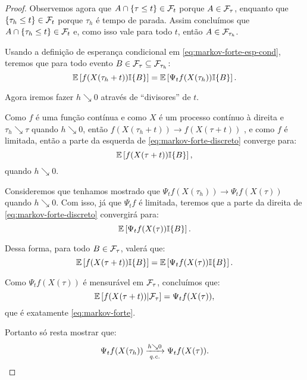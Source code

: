 \begin{proof}
  Observemos agora que $A \cap \{ \tau \leq t \} \in {\mathcal{F}}_t$ porque $A
  \in {\mathcal{F}}_\tau$, enquanto que $ \{ \tau_h \leq t \} \in {\mathcal{F}}_t$ porque
  $\tau_h$ é tempo de parada. Assim concluímos que $A \cap \{ \tau_h
  \leq t \} \in {\mathcal{F}}_t$ e, como isso vale para todo $t$, então $A \in
  {\mathcal{F}}_{\tau_h}$.

  Usando a definição de esperança condicional em
  \eqref{eq:markov-forte-esp-cond}, teremos que para todo evento $B
  \in {\mathcal{F}}_{\tau} \subseteq {\mathcal{F}}_{\tau_h}$:
  \begin{equation}
    \label{eq:markov-forte-discreto}
    {\mathbb{E}} \left[ f(X(\tau_h + t)) {\mathbb{I}}\{B\} \right]
    = {\mathbb{E}} \left[ \Psi_t f (X(\tau_h)) {\mathbb{I}}\{B\} \right].
  \end{equation}

  Agora iremos fazer $h \searrow 0$ através de ``divisores'' de $t$.

  Como $f$ é uma função contínua e como $X$ é um processo contínuo à
  direita e $\tau_h \searrow \tau$ quando $h \searrow 0$, então
  $f(X(\tau_h + t)) \to f(X(\tau + t))$ \qc, e como $f$ é limitada,
  então a parte da esquerda de \eqref{eq:markov-forte-discreto}
  converge para:
  \begin{displaymath}
    {\mathbb{E}} \left[ f(X(\tau + t)) {\mathbb{I}}\{B\} \right],
  \end{displaymath}
  quando $h \searrow 0$.

  Consideremos que tenhamos mostrado que $\Psi_t f (X(\tau_h)) \to
  \Psi_t f(X(\tau))$ \qc quando $h \searrow 0$. Com isso, já que
  $\Psi_t f$ é limitada, teremos que a parte da direita de
  \eqref{eq:markov-forte-discreto} convergirá para:
  \begin{displaymath}
    {\mathbb{E}} \left[ \Psi_t f (X(\tau)) {\mathbb{I}}\{B\} \right].
  \end{displaymath}

  Dessa forma, para todo $B \in {\mathcal{F}}_{\tau}$, valerá que:
  \begin{displaymath}
    {\mathbb{E}} \left[ f(X(\tau + t)) {\mathbb{I}}\{B\} \right]
    = {\mathbb{E}} \left[ \Psi_t f (X(\tau)) {\mathbb{I}}\{B\} \right].
  \end{displaymath}

  Como $\Psi_t f(X(\tau))$ é mensurável em ${\mathcal{F}}_\tau$, concluímos que:
  \begin{displaymath}
    {\mathbb{E}} \left[ f(X(\tau + t)) \middle| {\mathcal{F}}_\tau \right]
    = \Psi_t f (X(\tau)),
  \end{displaymath}
  que é exatamente \eqref{eq:markov-forte}.

  Portanto só resta mostrar que:
  \begin{equation}
    \label{eq:convergencia-discretizacao-1}
    \Psi_t f (X(\tau_h)) \xrightarrow[{\emph{q.c.}}]{h \searrow 0}
    \Psi_t f(X(\tau)).
  \end{equation}
  

\end{proof}
